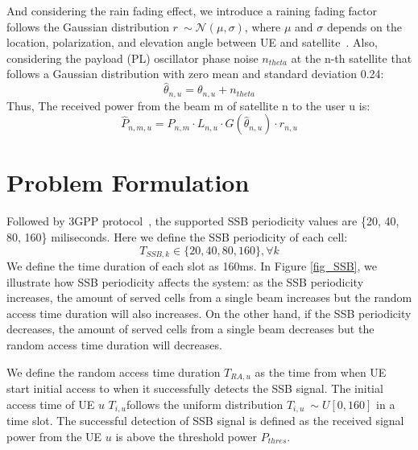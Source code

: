 And considering the rain fading effect, we introduce a raining fading factor follows the Gaussian distribution $r~\sim \mathcal{N}(\mu, \sigma)$, where $\mu$ and $\sigma$
depends on the location, polarization, and elevation angle between UE and satellite~\cite{User-Scheduling}. 
Also, considering the payload (PL) oscillator phase noise $n_{theta}$ at the n-th satellite that follows a Gaussian distribution with zero mean and standard deviation 0.24:
\begin{equation}
    \hat\theta_{n,u} = \theta_{n,u} + n_{theta}
\end{equation}
Thus, The received power from the beam m of satellite n to the user u is:
\begin{equation}
    \hat{P}_{n,m,u} = P_{n,m} \cdot L_{n,u} \cdot G(\hat\theta_{n,u}) \cdot r_{n,u}
\end{equation}

\section{Problem Formulation}
Followed by 3GPP protocol~\cite{38331}, the supported SSB periodicity values are 
\{20, 40, 80, 160\} miliseconds. Here we define the SSB periodicity of each cell:
\begin{equation}
    T_{SSB, k}\in\{20, 40, 80, 160\}, \forall k
\end{equation}
We define the time duration of each slot as 160ms. In Figure \ref{fig_SSB}, we illustrate how SSB periodicity affects the system: as the SSB periodicity increases, the amount of served cells from a single beam increases but the random access time duration will also increases. On the other hand, if the SSB periodicity decreases, the amount of served cells from a single beam decreases but the random access time duration will decreases.


We define the random access time duration $T_{RA,u}$ as the time from when UE start initial access to when it successfully detects the SSB signal. The initial access time of UE $u$ $T_{i,u}$follows the uniform distribution $T_{i,u}~\sim U[0, 160]$ in a time slot. The successful detection of SSB signal is defined as the received signal power from the UE $u$ is above the threshold power $P_{thres}$.


